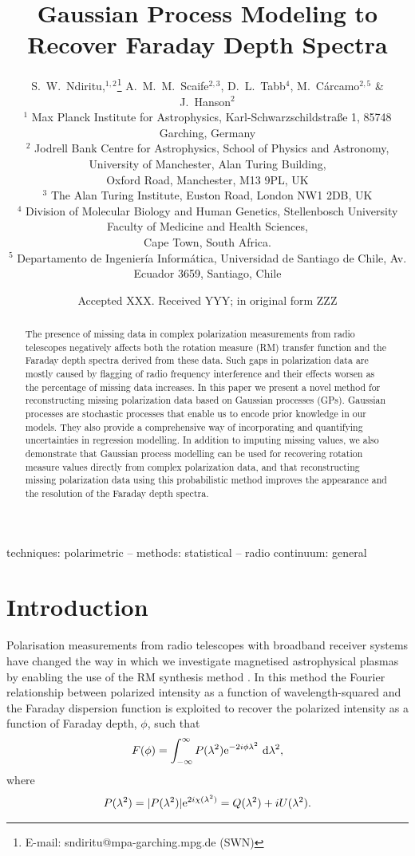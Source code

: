 \documentclass[fleqn,usenatbib]{mnras}
\title[GPM for Faraday Depth Spectra]{Gaussian Process Modeling to Recover Faraday Depth Spectra}
\author[S.~W.~Ndiritu et al.]{
S.~W.~Ndiritu,$^{1,2}$\thanks{E-mail: sndiritu@mpa-garching.mpg.de
 (SWN)}
A.~M.~M.~Scaife$^{2,3}$,
D.~L.~Tabb$^{4}$,
M.~C{\'a}rcamo$^{2,5}$ \&
J.~Hanson$^{2}$ \\
$^{1}$ Max Planck Institute for Astrophysics, Karl-Schwarzschildstra{\ss}e 1, 85748 Garching, Germany \\
$^{2}$ Jodrell Bank Centre for Astrophysics, School of Physics and Astronomy, University of Manchester, Alan Turing Building,\\ Oxford Road, Manchester, M13 9PL, UK \\
$^{3}$ The Alan Turing Institute, Euston Road, London NW1 2DB, UK \\
$^{4}$ Division of Molecular Biology and Human Genetics, Stellenbosch University Faculty of Medicine and Health Sciences, \\ Cape Town, South Africa. \\
$^{5}$ Departamento de Ingenier\'ia Inform\'atica, Universidad de Santiago de Chile, Av. Ecuador 3659, Santiago, Chile \\
}
\date{Accepted XXX. Received YYY; in original form ZZZ}
\begin{document}
\label{firstpage}
\pagerange{\pageref{firstpage}--\pageref{lastpage}}
\maketitle

\begin{abstract}
The presence of missing data in complex polarization measurements from radio telescopes negatively affects both the rotation measure (RM) transfer function and the Faraday depth spectra derived from these data. Such gaps in polarization data are mostly caused by flagging of radio frequency interference and their effects worsen as the percentage of missing data increases. In this paper we present a novel method for reconstructing missing polarization data based on Gaussian processes (GPs). Gaussian processes are stochastic processes that enable us to encode prior knowledge in our models. They also provide a comprehensive way of incorporating and quantifying uncertainties in regression modelling. In addition to imputing missing values, we also demonstrate that Gaussian process modelling can be used for recovering rotation measure values directly from complex polarization data, and that reconstructing missing polarization data using this probabilistic method improves the appearance and the resolution of the Faraday depth spectra.
\end{abstract}

\begin{keywords}
techniques: polarimetric -- methods: statistical -- radio continuum: general
\end{keywords}



\section{Introduction}

Polarisation measurements from radio telescopes with broadband receiver systems have changed the way in which we investigate magnetised astrophysical plasmas by enabling the use of the RM synthesis method \citep{1966MNRAS.133...67B, 2005A&A...441.1217B}. In this method the Fourier relationship between polarized intensity as a function of wavelength-squared and the Faraday dispersion function is exploited to recover the polarized intensity as a function of Faraday depth, $\phi$, such that
%
\begin{equation}
\label{eq:fourier}
F(\phi) = \int_{-\infty}^{\infty}{ P(\lambda^2){\rm e}^{-2i\phi \lambda^2}~{\rm d}\lambda^2 },
\end{equation}
%
where
%
\begin{equation}
\label{eq:pol}
P(\lambda^2) = |P(\lambda^2)|{\rm e}^{2i\chi(\lambda^2)} = Q(\lambda^2) + iU(\lambda^2).
\end{equation}
\end{document}
